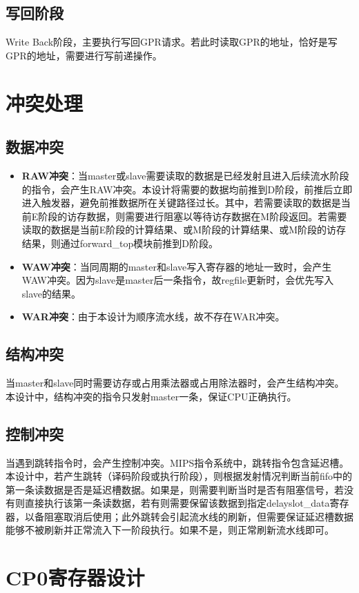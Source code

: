 \subsection{写回阶段}
Write Back阶段，主要执行写回GPR请求。若此时读取GPR的地址，恰好是写GPR的地址，需要进行写前递操作。

\section{冲突处理}
\subsection{数据冲突}
\begin{itemize}
    \item \textbf{RAW冲突}：当master或slave需要读取的数据是已经发射且进入后续流水阶段的指令，会产生RAW冲突。本设计将需要的数据均前推到D阶段，前推后立即进入触发器，避免前推数据所在关键路径过长。其中，若需要读取的数据是当前E阶段的访存数据，则需要进行阻塞以等待访存数据在M阶段返回。若需要读取的数据是当前E阶段的计算结果、或M阶段的计算结果、或M阶段的访存结果，则通过forward\_top模块前推到D阶段。
    \item \textbf{WAW冲突}：当同周期的master和slave写入寄存器的地址一致时，会产生WAW冲突。因为slave是master后一条指令，故regfile更新时，会优先写入slave的结果。
    \item \textbf{WAR冲突}：由于本设计为顺序流水线，故不存在WAR冲突。
\end{itemize}

\subsection{结构冲突}
当master和slave同时需要访存或占用乘法器或占用除法器时，会产生结构冲突。本设计中，结构冲突的指令只发射master一条，保证CPU正确执行。

\subsection{控制冲突}
当遇到跳转指令时，会产生控制冲突。MIPS指令系统中，跳转指令包含延迟槽。本设计中，若产生跳转（译码阶段或执行阶段），则根据发射情况判断当前fifo中的第一条读数据是否是延迟槽数据。如果是，则需要判断当时是否有阻塞信号，若没有则直接执行该第一条读数据，若有则需要保留该数据到指定delayslot\_data寄存器，以备阻塞取消后使用；此外跳转会引起流水线的刷新，但需要保证延迟槽数据能够不被刷新并正常流入下一阶段执行。如果不是，则正常刷新流水线即可。

\section{CP0寄存器设计}
\todo 

